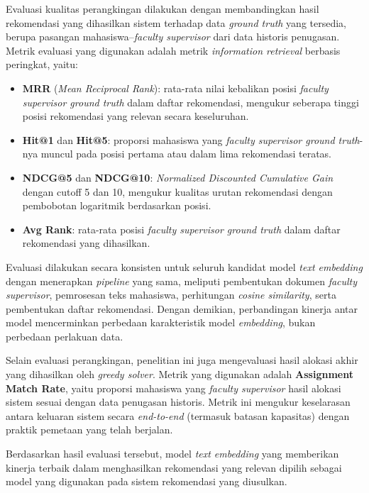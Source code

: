 Evaluasi kualitas perangkingan dilakukan dengan membandingkan hasil rekomendasi yang dihasilkan sistem terhadap data \textit{ground truth} yang tersedia, berupa pasangan mahasiswa--\textit{faculty supervisor} dari data historis penugasan. Metrik evaluasi yang digunakan adalah metrik \textit{information retrieval} berbasis peringkat, yaitu:

\begin{itemize}
    \item \textbf{MRR} (\textit{Mean Reciprocal Rank}): rata-rata nilai kebalikan posisi \textit{faculty supervisor ground truth} dalam daftar rekomendasi, mengukur seberapa tinggi posisi rekomendasi yang relevan secara keseluruhan.
    \item \textbf{Hit@1} dan \textbf{Hit@5}: proporsi mahasiswa yang \textit{faculty supervisor ground truth}-nya muncul pada posisi pertama atau dalam lima rekomendasi teratas.
    \item \textbf{NDCG@5} dan \textbf{NDCG@10}: \textit{Normalized Discounted Cumulative Gain} dengan cutoff 5 dan 10, mengukur kualitas urutan rekomendasi dengan pembobotan logaritmik berdasarkan posisi.
    \item \textbf{Avg Rank}: rata-rata posisi \textit{faculty supervisor ground truth} dalam daftar rekomendasi yang dihasilkan.
\end{itemize}

Evaluasi dilakukan secara konsisten untuk seluruh kandidat model \textit{text embedding} dengan menerapkan \textit{pipeline} yang sama, meliputi pembentukan dokumen \textit{faculty supervisor}, pemrosesan teks mahasiswa, perhitungan \textit{cosine similarity}, serta pembentukan daftar rekomendasi. Dengan demikian, perbandingan kinerja antar model mencerminkan perbedaan karakteristik model \textit{embedding}, bukan perbedaan perlakuan data.

Selain evaluasi perangkingan, penelitian ini juga mengevaluasi hasil alokasi akhir yang dihasilkan oleh \textit{greedy solver}. Metrik yang digunakan adalah \textbf{Assignment Match Rate}, yaitu proporsi mahasiswa yang \textit{faculty supervisor} hasil alokasi sistem sesuai dengan data penugasan historis. Metrik ini mengukur keselarasan antara keluaran sistem secara \textit{end-to-end} (termasuk batasan kapasitas) dengan praktik pemetaan yang telah berjalan.

Berdasarkan hasil evaluasi tersebut, model \textit{text embedding} yang memberikan kinerja terbaik dalam menghasilkan rekomendasi yang relevan dipilih sebagai model yang digunakan pada sistem rekomendasi yang diusulkan.

